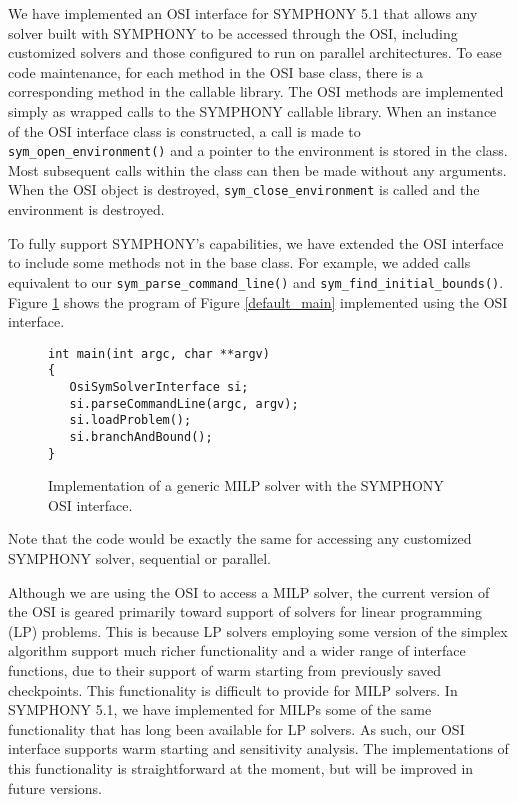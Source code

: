 We have implemented an OSI interface for SYMPHONY 5.1 that allows any solver
built with SYMPHONY to be accessed through the OSI, including customized
solvers and those configured to run on parallel architectures. To ease code
maintenance, for each method in the OSI base class, there is a corresponding
method in the callable library. The OSI methods are implemented simply as
wrapped calls to the SYMPHONY callable library. When an instance of the OSI
interface class is constructed, a call is made to
\texttt{sym\_open\_environment()} and a pointer to the environment is stored
in the class. Most subsequent calls within the class can then be made without
any arguments. When the OSI object is destroyed,
\texttt{sym\_close\_environment} is called and the environment is destroyed.

To fully support SYMPHONY's capabilities, we have extended the OSI interface to
include some methods not in the base class. For example, we added calls
equivalent to our \texttt{sym\_parse\_command\_line()} and
\texttt{sym\_find\_initial\_bounds()}. Figure \ref{OSI_main} shows the
program of Figure \ref{default_main} implemented using the OSI interface.
\begin{figure}[tb]
\begin{Verbatim}[frame=lines]
int main(int argc, char **argv)
{
   OsiSymSolverInterface si;
   si.parseCommandLine(argc, argv);
   si.loadProblem();
   si.branchAndBound();
}
\end{Verbatim}
\caption{Implementation of a generic MILP solver with the SYMPHONY
OSI interface. \label{OSI_main}}
\end{figure}
Note that the code would be exactly the same for accessing any customized
SYMPHONY solver, sequential or parallel.

Although we are using the OSI to access a MILP solver, the current version of
the OSI is geared primarily toward support of solvers for linear programming
(LP) problems. This is because LP solvers employing some version of the
simplex algorithm support much richer functionality and a wider range of
interface functions, due to their support of warm starting from previously
saved checkpoints. This functionality is difficult to provide for MILP
solvers.  In SYMPHONY 5.1, we have implemented for MILPs some of the same
functionality that has long been available for LP solvers. As such, our OSI
interface supports warm starting and sensitivity analysis. The implementations
of this functionality is straightforward at the moment, but will be improved
in future versions.

